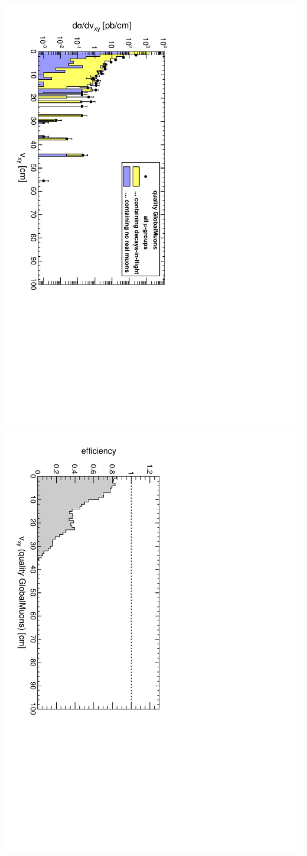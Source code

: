 \documentclass[compress]{beamer}
\begin{document}
\begin{frame}
\begin{center}
{\includegraphics[height=0.45\linewidth, angle=90]{dispvert_QualityGlobalMuonAny.pdf}
\includegraphics[height=0.45\linewidth, angle=90]{dispvert_eff_QualityGlobalMuonAny.pdf}}
\end{center}
\end{frame}


\end{document}
